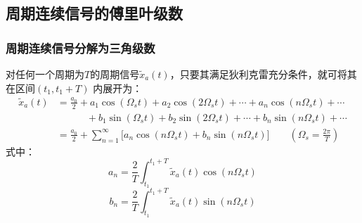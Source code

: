 \documentclass[notheorems,compress,mathserif,table]{beamer}
\begin{document}
\subsection{周期连续信号的傅里叶级数}
%
%
%
\begin{frame}\frametitle{周期连续信号分解为三角级数}%
对任何一个周期为$T$的周期信号$\tilde{x}_a(t)$，只要其满足狄利克雷充分条件，就可将其在区间$(t_1,t_1+T)$ 内展开为：
\begin{equation*}
\begin{split}
 \tilde{x}_a(t) &= \frac{a_0}{2}+a_1 \cos(\Omega_s t)+a_2 \cos(2\Omega_s t) + \cdots + a_n \cos(n\Omega_s t) + \cdots\\
                      &  \quad\quad\quad   +b_1 \sin(\Omega_s t)+b_2 \sin(2\Omega_s t) +\cdots + b_n \sin(n\Omega_s t)+ \cdots\\                    
                      &= \frac{a_0}{2}+\sum_{n=1}^{\infty}\Big[a_n \cos(n \Omega_s t)+
                        b_n \sin(n \Omega_s t)\Big]\quad\quad                       \left(\Omega_s = \frac{2\pi}{T}\right)
\end{split}
\end{equation*}
式中：
$$ a_n = \frac{2}{T}\int_{t_1}^{t_1+T}\tilde{x}_a(t)\cos \left(n\Omega_s t\right) $$
$$ b_n = \frac{2}{T}\int_{t_1}^{t_1+T}\tilde{x}_a(t)\sin \left(n\Omega_s t\right) $$
\end{frame}
%
%
%
\end{document}
